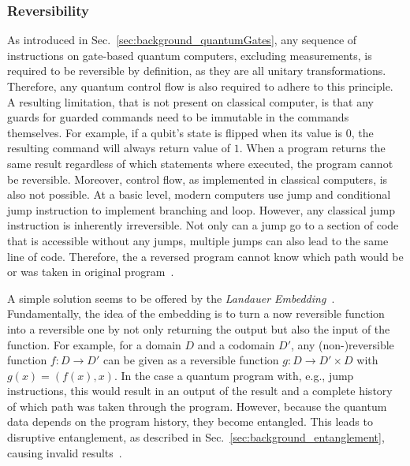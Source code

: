 \subsubsection{Reversibility}
\label{sec:background_controlflow_reversibility}
As introduced in Sec.~\ref{sec:background_quantumGates}, any sequence of instructions on gate-based quantum computers, excluding measurements, is required to be reversible by definition, as they are all unitary transformations. Therefore, any quantum control flow is also required to adhere to this principle. A resulting limitation, that is not present on classical computer, is that any guards for guarded commands need to be immutable in the commands themselves. For example, if a qubit's state is flipped when its value is $0$, the resulting command will always return value of $1$. When a program returns the same result regardless of which statements where executed, the program cannot be reversible.    
Moreover, control flow, as implemented in classical computers, is also not possible. At a basic level, modern computers use jump and conditional jump instruction to implement branching and loop. However, any classical jump instruction is inherently irreversible. Not only can a jump go to a section of code that is accessible without any jumps, multiple jumps can also lead to the same line of code. Therefore, the a reversed program cannot know which path would be or was taken in original program~\cite{YVC24}.  

A simple solution seems to be offered by the \emph{Landauer Embedding}~\cite{Land61}. Fundamentally, the idea of the embedding is to turn a now reversible function into a reversible one by not only returning the output but also the input of the function. For example, for a domain $D$ and a codomain $D'$, any (non-)reversible function $f : D \to D'$ can be given as a reversible function $g : D \to D' \times D$ with $g(x) = (f(x), x)$. In the case a quantum program with, e.g., jump instructions, this would result in an output of the result and a complete history of which path was taken through the program. However, because the quantum data depends on the program history, they become entangled. This leads to disruptive entanglement, as described in Sec.~\ref{sec:background_entanglement}, causing invalid results~\cite{YVC24}. 


